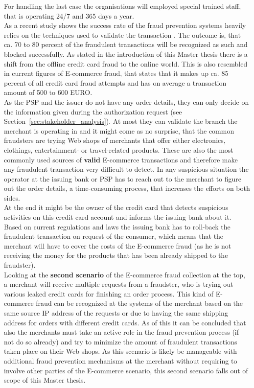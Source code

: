 For handling the last case the organisations will employed special trained staff, that is operating 24/7 and 365 days a year. \\

As a recent study shows the success rate of the fraud prevention systems heavily relies on the techniques used to validate the transaction \citep{rana2015survey}. The outcome is, that ca. 70 to 80 percent of the fraudulent transactions will be recognized as such and blocked successfully. As stated in the introduction of this Master thesis there is a shift from the offline credit card fraud to the online world. This is also resembled in current figures of E-commerce fraud, that states that it makes up ca. 85 percent of all credit card fraud attempts and has on average a transaction amount of 500 to 600 EURO. \\

As the \gls{PSP} and the issuer do not have any order details, they can only decide on the information given during the authorization request (see Section~\ref{sec:stakeholder_analysis}). At most they can validate the branch the merchant is operating in and it might come as no surprise, that the common fraudsters are trying Web shops of merchants that offer either electronics, clothings, entertainment- or travel-related products. These are also the most commonly used sources of \textbf{valid} E-commerce transactions and therefore make any fraudulent transaction very difficult to detect. In any suspicious situation the operator at the issuing bank or \gls{PSP} has to reach out to the merchant to figure out the order details, a time-consuming process, that increases the efforts on both sides. \\

At the end it might be the owner of the credit card that detects suspicious activities on this credit card account and informs the issuing bank about it. Based on current regulations and laws the issuing bank has to roll-back the fraudulent transaction on request of the consumer, which means that the merchant will have to cover the costs of the E-commerce fraud (as he is not receiving the money for the products that has been already shipped to the fraudster). \\

Looking at the \textbf{second scenario} of the E-commerce fraud collection at the top, a merchant will receive multiple requests from a fraudster, who is trying out various leaked credit cards for finishing an order process. This kind of E-commerce fraud can be recognized at the systems of the merchant based on the same source \gls{IP} address of the requests or due to having the same shipping address for orders with different credit cards. As of this it can be concluded that also the merchants must take an active role in the fraud prevention process (if not do so already) and try to minimize the amount of fraudulent transactions taken place on their Web shops. As this scenario is likely be manageable with additional fraud prevention mechanisms at the merchant without requiring to involve other parties of the E-commerce scenario, this second scenario falls out of scope of this Master thesis. 

